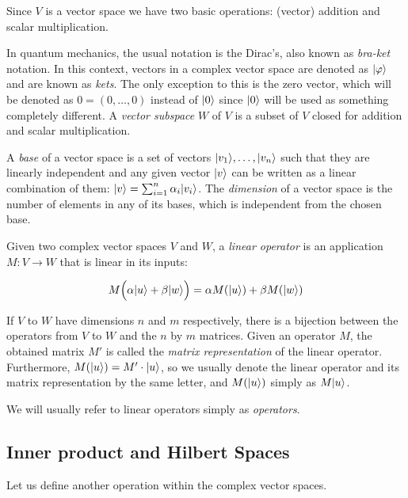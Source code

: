 Since $V$ is a vector space we have two basic operations: (vector) addition and scalar multiplication.

In quantum mechanics, the usual notation is the Dirac's, also known as \emph{bra-ket} notation. In this context, vectors in a complex vector space are denoted as $|\varphi\rangle$ and are known as \emph{kets}. The only exception to this is the zero vector, which will be denoted as $0 = (0, \dotsc, 0)$ instead of $|0\rangle$ since $|0\rangle$ will be used as something completely different. A \emph{vector subspace} $W$ of $V$ is a subset of $V$ closed for addition and scalar multiplication.

A \emph{base} of a vector space is a set of vectors $|v_1\rangle, \dotsc, |v_n\rangle$ such that they are linearly independent and any given vector $|v\rangle$ can be written as a linear combination of them: $|v\rangle = \sum_{i=1}^n \alpha_i|v_i\rangle$. The \emph{dimension} of a vector space is the number of elements in any of its bases, which is independent from the chosen base.

\begin{definition}
	Given two complex vector spaces $V$ and $W$, a \emph{linear operator} is an application $M: V \rightarrow W $ that is linear in its inputs:
	
	$$ M \Big( \alpha |u\rangle + \beta |w\rangle \Big) = \alpha M (|u\rangle) + \beta M (|w\rangle) $$
\end{definition}

If $V$ to $W$ have dimensions $n$ and $m$ respectively, there is a bijection between the operators from $V$ to $W$ and the $n$ by $m$ matrices. Given an operator $M$, the obtained matrix $M'$ is called the \emph{matrix representation} of the linear operator. Furthermore, $M(|u\rangle) = M' \cdot |u\rangle$, so we usually denote the linear operator and its matrix representation by the same letter, and $M(|u\rangle)$ simply as $M|u\rangle$.

We will usually refer to linear operators simply as \emph{operators}.


\subsection{Inner product and Hilbert Spaces}


Let us define another operation within the complex vector spaces.

